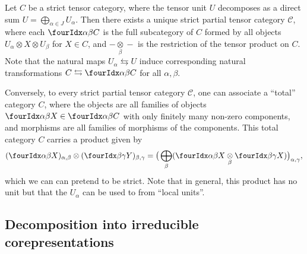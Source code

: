 Let $C$ be a strict tensor category, where the tensor unit $U$
decomposes as a direct sum $U=\bigoplus_{\alpha \in J}
U_{\alpha}$. Then there exists a unique strict partial tensor category
$\mathscr{C}$, where each $\Gru{C}{\alpha}{\beta}$ is the full
subcategory of $C$ formed by all objects $U_{\alpha} \otimes X \otimes
U_{\beta}$ for $X \in C$, and $-\underset{\beta}{\otimes}-$ is the
restriction of the tensor product on $C$. Note that the natural maps
$U_{\alpha} \leftrightarrows U$ induce corresponding natural
transformations $C \leftrightarrows \Gru{C}{\alpha}{\beta}$ for all $\alpha,\beta$.

Conversely, to every strict partial  tensor category
$\mathscr{C}$, one can associate a ``total''  
category $C$, where the objects are all families of objects
$\Gru{X}{\alpha}{\beta} \in \Gru{C}{\alpha}{\beta}$ with only finitely
many non-zero components, and morphisms are all
families of morphisms of the components. This total category $C$
carries a  product given by
\begin{align*}
  (\Gru{X}{\alpha}{\beta})_{\alpha,\beta} \otimes
  (\Gru{Y}{\beta}{\gamma})_{\beta,\gamma} = \big(\bigoplus_{\beta}
(\Gru{X}{\alpha}{\beta} \underset{\beta}{\otimes}   \Gru{X}{\beta}{\gamma})\big)_{\alpha,\gamma},
\end{align*}
which we can can pretend to be strict. Note that in general,
this product has no unit but that the $U_{\alpha}$ can be used to from  ``local units''. 





\subsection{Decomposition into irreducible corepresentations}



